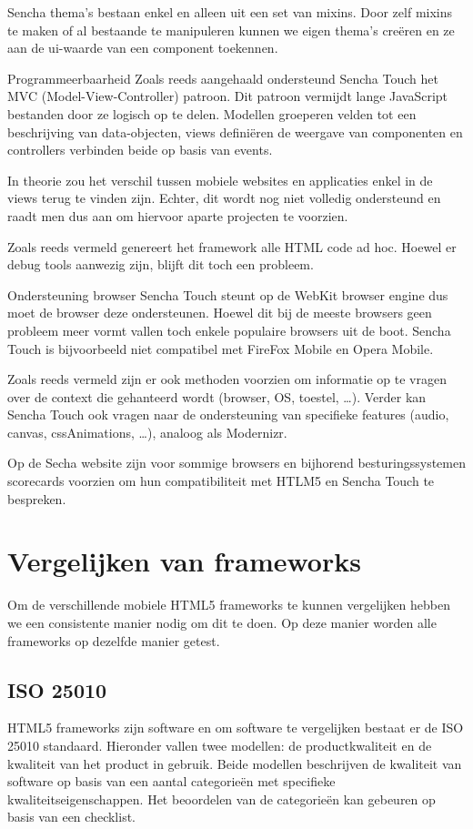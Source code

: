 Sencha thema's bestaan enkel en alleen uit een set van mixins.  Door zelf mixins te maken of al bestaande te manipuleren kunnen we eigen thema's creëren en ze aan de ui-waarde van een component toekennen.

Programmeerbaarheid
Zoals reeds aangehaald ondersteund Sencha Touch het MVC (Model-View-Controller) patroon.  Dit patroon vermijdt lange JavaScript bestanden door ze logisch op te delen.  Modellen groeperen velden tot een beschrijving van data-objecten,  views definiëren de weergave van componenten en controllers verbinden beide op basis van events.

In theorie zou het verschil tussen mobiele websites en applicaties enkel in de views terug te vinden zijn.  Echter,  dit wordt nog niet volledig ondersteund en raadt men dus aan om hiervoor aparte projecten te voorzien.

Zoals reeds vermeld genereert het framework alle HTML code ad hoc. Hoewel er debug tools aanwezig zijn, blijft dit toch een probleem.  

Ondersteuning browser
Sencha Touch steunt op de WebKit browser engine dus moet de browser deze ondersteunen.  Hoewel dit bij de meeste browsers geen probleem meer vormt vallen toch enkele populaire browsers uit de boot.  Sencha Touch is bijvoorbeeld niet compatibel met FireFox Mobile en Opera Mobile.

Zoals reeds vermeld zijn er ook methoden voorzien om informatie op te vragen over de context die gehanteerd wordt (browser, OS, toestel, …).  Verder kan Sencha Touch ook vragen naar de ondersteuning van specifieke features (audio,  canvas,  cssAnimations, …),  analoog als Modernizr.  

Op de Secha website zijn voor sommige browsers en bijhorend besturingssystemen scorecards voorzien om hun compatibiliteit met HTLM5 en Sencha Touch te bespreken.


\section{Vergelijken van frameworks}
Om de verschillende mobiele HTML5 frameworks te kunnen vergelijken hebben we een consistente manier nodig om dit te doen.  Op deze manier worden alle frameworks op dezelfde manier getest.

\subsection{ISO 25010}
HTML5 frameworks zijn software en om software te vergelijken bestaat er de ISO 25010 standaard.  Hieronder vallen twee modellen:  de productkwaliteit en de kwaliteit van het product in gebruik.  Beide modellen beschrijven de kwaliteit van software op basis van een aantal categorieën met specifieke kwaliteitseigenschappen. Het beoordelen van de categorieën kan gebeuren op basis van een checklist. 
 
